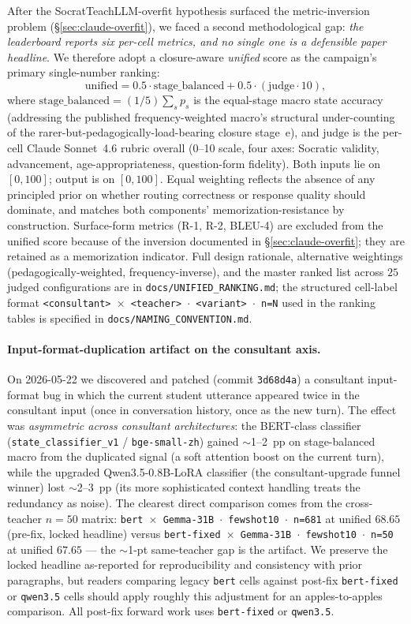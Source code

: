 \documentclass[11pt]{article}
\begin{document}
After the SocratTeachLLM-overfit hypothesis surfaced the metric-inversion problem (\S\ref{sec:claude-overfit}), we faced a second methodological gap: \emph{the leaderboard reports six per-cell metrics, and no single one is a defensible paper headline}. We therefore adopt a closure-aware \emph{unified} score as the campaign's primary single-number ranking:
\[
\mathrm{unified} = 0.5 \cdot \mathrm{stage\_balanced} + 0.5 \cdot (\mathrm{judge} \cdot 10),
\]
where $\mathrm{stage\_balanced} = (1/5)\sum_s p_s$ is the equal-stage macro state accuracy (addressing the published frequency-weighted macro's structural under-counting of the rarer-but-pedagogically-load-bearing closure stage~e), and $\mathrm{judge}$ is the per-cell Claude Sonnet~4.6 rubric overall (0--10 scale, four axes: Socratic validity, advancement, age-appropriateness, question-form fidelity). Both inputs lie on $[0, 100]$; output is on $[0, 100]$. Equal weighting reflects the absence of any principled prior on whether routing correctness or response quality should dominate, and matches both components' memorization-resistance by construction. Surface-form metrics (R-1, R-2, BLEU-4) are excluded from the unified score because of the inversion documented in \S\ref{sec:claude-overfit}; they are retained as a memorization indicator. Full design rationale, alternative weightings (pedagogically-weighted, frequency-inverse), and the master ranked list across $25$ judged configurations are in \texttt{docs/UNIFIED\_RANKING.md}; the structured cell-label format \texttt{<consultant> $\times$ <teacher> $\cdot$ <variant> $\cdot$ n=N} used in the ranking tables is specified in \texttt{docs/NAMING\_CONVENTION.md}.

\paragraph{Input-format-duplication artifact on the consultant axis.} On 2026-05-22 we discovered and patched (commit \texttt{3d68d4a}) a consultant input-format bug in which the current student utterance appeared twice in the consultant input (once in conversation history, once as the new turn). The effect was \emph{asymmetric across consultant architectures}: the BERT-class classifier (\texttt{state\_classifier\_v1} / \texttt{bge-small-zh}) gained $\sim$1--2~pp on stage-balanced macro from the duplicated signal (a soft attention boost on the current turn), while the upgraded Qwen3.5-0.8B-LoRA classifier (the consultant-upgrade funnel winner) lost $\sim$2--3~pp (its more sophisticated context handling treats the redundancy as noise). The clearest direct comparison comes from the cross-teacher $n{=}50$ matrix: \texttt{bert $\times$ Gemma-31B $\cdot$ fewshot10 $\cdot$ n=681} at unified $68.65$ (pre-fix, locked headline) versus \texttt{bert-fixed $\times$ Gemma-31B $\cdot$ fewshot10 $\cdot$ n=50} at unified $67.65$ --- the $\sim$1-pt same-teacher gap is the artifact. We preserve the locked headline as-reported for reproducibility and consistency with prior paragraphs, but readers comparing legacy \texttt{bert} cells against post-fix \texttt{bert-fixed} or \texttt{qwen3.5} cells should apply roughly this adjustment for an apples-to-apples comparison. All post-fix forward work uses \texttt{bert-fixed} or \texttt{qwen3.5}.
\end{document}
